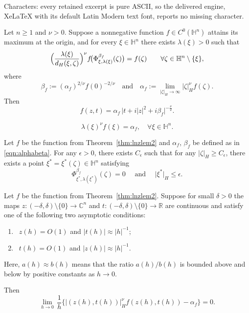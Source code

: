 \documentclass[10pt,a4paper]{amsart}
\begin{document}
Characters: every retained excerpt is pure ASCII, so the delivered engine, XeLaTeX with its default Latin Modern text font, reports no missing character.
\begin{thm} \label{thm:lnzlem2}
Let \(n\ge 1\) and \(\nu>0\). Suppose a nonnegative function \(f\in C^0(\mathbb{H}^n)\) attains its maximum at the origin, and for every \(\xi\in\mathbb{H}^n\) there exists \(\lambda(\xi)>0\) such that
\[
\Bigl(\frac{\lambda(\xi)}{d_H(\xi,\zeta)}\Bigr)^{\nu}
f\!\bigl(\Phi_{\xi,\lambda(\xi)}^{\beta_f}(\zeta)\bigr)=f(\zeta)
\qquad \forall \zeta\in\mathbb{H}^n\setminus\{\xi\},
\]
where 
\begin{equation}\label{eqn:alphabeta}
\beta_f:=(\alpha_f)^{2/\nu}f(0)^{-2/\nu} \quad \text{and} \quad \alpha_f:=\lim_{|\zeta|_H\to\infty}|\zeta|_H^{\nu}f(\zeta).
\end{equation}
Then
\[
f(z,t) = \alpha_f\,\bigl| t + i|z|^2 + i\beta_f \bigr|^{-\frac{\nu}{2}}.
\]
\end{thm}

\begin{equation}\label{eqn:alphaf1}
\lambda(\xi)^{\nu} f(\xi) = \alpha_f, \quad \forall \xi \in \mathbb{H}^{n} . 
\end{equation}

\begin{lem}\label{lem:fixedpoint1}
Let $f$ be the function from Theorem~\ref{thm:lnzlem2} and $\alpha_f$, $\beta_f$ be defined as in \eqref{eqn:alphabeta}.
For any $\epsilon>0$, there exists $C_{\epsilon}$ such that for any $|\zeta|_{\! H} \geq C_{\epsilon}$, there exists a point $\xi^{\ast}=\xi^{\ast}(\zeta) \in \mathbb{H}^n$ satisfying
\begin{equation}\label{fixedpoint1}
\Phi_{\xi^{\ast}, \lambda(\xi^{\ast})}^{\beta_f}(\zeta) = 0 
\quad \text { and } \quad \big|\xi^{\ast}\big|_{\! H} \leq \epsilon. 
\end{equation}
\end{lem}

\begin{lem}\label{lem:asymp}
Let $f$ be the function from Theorem~\ref{thm:lnzlem2}. Suppose for small $\delta>0$ the maps $z \colon (-\delta, \delta) \setminus \{0\} \to \mathbb{C}^n$ and $t \colon (-\delta, \delta) \setminus \{0\} \to \mathbb{R}$ are continuous and satisfy one of the following two asymptotic conditions:
\begin{enumerate}
\item[(A1)]\, $z(h) = O(1)$ and $|t(h)| \approx |h|^{-1}$;
\item[(A2)]\, $t(h) = O(1)$ and $|z(h)| \approx |h|^{-1}$.
\end{enumerate}
Here, $a(h) \approx b(h)$ means that the ratio $a(h)/b(h)$ is bounded above and below by positive constants as $h \to 0$.

Then 
\begin{equation}\label{eqn:asym2}
\lim_{h \to 0} \, \frac{1}{h} \Big\{ \bigl|(z(h), t(h))\bigr|_{\! H}^{\nu}  f(z(h), t(h)) - \alpha_f \Big\} = 0.
\end{equation}
\end{lem}
\end{document}
